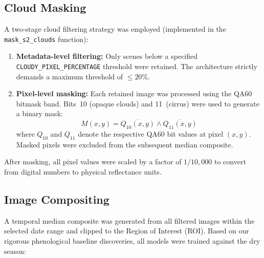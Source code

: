 \documentclass[12pt, a4paper, twocolumn]{article}
\begin{document}
\subsection{Cloud Masking}

A two-stage cloud filtering strategy was employed (implemented in the \texttt{mask\_s2\_clouds} function):

\begin{enumerate}[label=\arabic*.]
    \item \textbf{Metadata-level filtering:} Only scenes below a specified \texttt{CLOUDY\_PIXEL\_PERCENTAGE} threshold were retained. The architecture strictly demands a maximum threshold of $\leq 20\%$.
    
    \item \textbf{Pixel-level masking:} Each retained image was processed using the QA60 bitmask band. Bits~10 (opaque clouds) and 11~(cirrus) were used to generate a binary mask:
    \begin{equation}
        M(x,y) = \overline{Q_{10}(x,y)} \wedge \overline{Q_{11}(x,y)}
    \end{equation}
    where $Q_{10}$ and $Q_{11}$ denote the respective QA60 bit values at pixel $(x,y)$. Masked pixels were excluded from the subsequent median composite.
\end{enumerate}

After masking, all pixel values were scaled by a factor of $1/10{,}000$ to convert from digital numbers to physical reflectance units.

\subsection{Image Compositing}

A temporal median composite was generated from all filtered images within the selected date range and clipped to the Region of Interest (ROI). Based on our rigorous phenological baseline discoveries, all models were trained against the dry season:

\begin{table}[H]
\centering
\caption{Date ranges and cloud thresholds per classifier notebook.}
\label{tab:dates}
\end{table}
\end{document}
